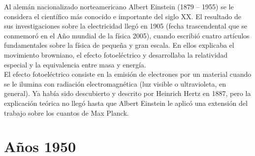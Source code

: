 \documentclass{article}
\begin{document}
Al alemán nacionalizado norteamericano Albert Einstein (1879 – 1955) se le considera el científico más conocido e importante del siglo XX. El resultado de sus investigaciones sobre la electricidad llegó en 1905 (fecha trascendental que se conmemoró en el Año mundial de la física 2005), cuando escribió cuatro artículos fundamentales sobre la física de pequeña y gran escala. En ellos explicaba el movimiento browniano, el efecto fotoeléctrico y desarrollaba la relatividad especial y la equivalencia entre masa y energía.\citep{HDE}\\

El efecto fotoeléctrico consiste en la emisión de electrones por un material cuando se le ilumina con radiación electromagnética (luz visible o ultravioleta, en general). Ya había sido descubierto y descrito por Heinrich Hertz en 1887, pero la explicación teórica no llegó hasta que Albert Einstein le aplicó una extensión del trabajo sobre los cuantos de Max Planck. \citep{HDE}\\



\section{Años 1950}







\end{document}
